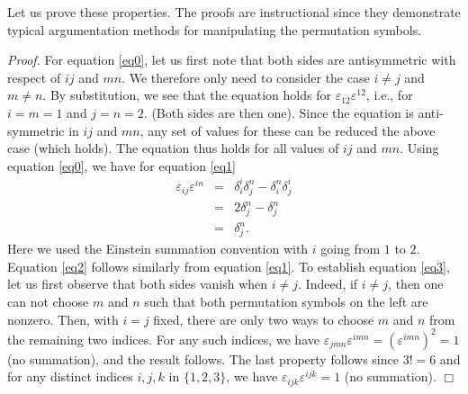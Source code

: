 \documentclass[12pt]{article}
\begin{document}
Let us prove these properties. The proofs are instructional since they
demonstrate typical argumentation methods for manipulating the
permutation symbols.

\emph{Proof.} For equation \ref{eq0}, let us first note that both sides
are antisymmetric with respect of $ij$ and $mn$. We therefore only need
to consider the case $i\neq j$ and $m\neq n$. By substitution, we see that
the equation holds for $\varepsilon_{12} \varepsilon^{12}$, i.e., for 
$i=m=1$ and $j=n=2$. (Both sides are then one). Since the equation is 
anti-symmetric in $ij$ and $mn$, any set of values for these can be 
reduced the above case (which holds). The equation 
thus holds for all values of $ij$ and $mn$.
Using equation \ref{eq0}, we have for equation \ref{eq1} 
\begin{eqnarray*}
\varepsilon_{ij}\varepsilon^{in} &=& \delta_i^i \delta_j^n - \delta^n_i \delta^i_j\\
&=& 2 \delta_j^n - \delta^n_j\\
&=& \delta_j^n. 
\end{eqnarray*}
Here we used the Einstein summation convention with $i$ going from $1$ to $2$. 
Equation \ref{eq2} follows similarly from equation \ref{eq1}.
To establish equation \ref{eq3}, let us first observe that both sides 
vanish when $i\neq j$. Indeed, if $i\neq j$, then one can not choose 
$m$ and $n$ such that both permutation symbols on the left are nonzero. Then, 
with $i=j$ fixed, there are only two ways to choose $m$ and $n$ from the remaining
two indices. For any such indices, we have
$\varepsilon_{jmn} \varepsilon^{imn} = (\varepsilon^{imn})^2 = 1$ (no summation),
and the result follows. The last property follows since $3!=6$ and for any 
distinct indices $i,j,k$ in $\{1,2,3\}$, we have 
$\varepsilon_{ijk} \varepsilon^{ijk}=1$ (no summation). $\Box$
\end{document}
